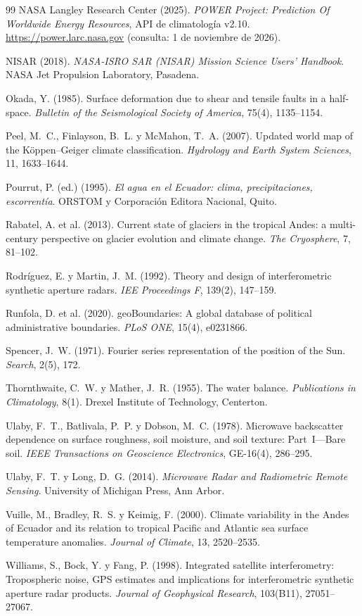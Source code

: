 \documentclass[11pt,a4paper]{article}
\begin{document}
\begin{thebibliography}{99}
 NASA Langley Research Center (2025). \emph{POWER Project: Prediction Of Worldwide
Energy Resources}, API de climatología v2.10. \url{https://power.larc.nasa.gov} (consulta: 1 de noviembre
de 2026).

 NISAR (2018). \emph{NASA-ISRO SAR (NISAR) Mission Science Users' Handbook}. NASA Jet
Propulsion Laboratory, Pasadena.

 Okada, Y. (1985). Surface deformation due to shear and tensile faults in a
half-space. \emph{Bulletin of the Seismological Society of America}, 75(4), 1135--1154.

 Peel, M.~C., Finlayson, B.~L. y McMahon, T.~A. (2007). Updated world map of the
Köppen--Geiger climate classification. \emph{Hydrology and Earth System Sciences}, 11, 1633--1644.

 Pourrut, P. (ed.) (1995). \emph{El agua en el Ecuador: clima, precipitaciones,
escorrentía}. ORSTOM y Corporación Editora Nacional, Quito.

 Rabatel, A. et al. (2013). Current state of glaciers in the tropical Andes: a
multi-century perspective on glacier evolution and climate change. \emph{The Cryosphere}, 7, 81--102.

 Rodríguez, E. y Martin, J.~M. (1992). Theory and design of interferometric
synthetic aperture radars. \emph{IEE Proceedings F}, 139(2), 147--159.

 Runfola, D. et al. (2020). geoBoundaries: A global database of political
administrative boundaries. \emph{PLoS ONE}, 15(4), e0231866.

 Spencer, J.~W. (1971). Fourier series representation of the position of the Sun.
\emph{Search}, 2(5), 172.

 Thornthwaite, C.~W. y Mather, J.~R. (1955). The water balance.
\emph{Publications in Climatology}, 8(1). Drexel Institute of Technology, Centerton.

 Ulaby, F.~T., Batlivala, P.~P. y Dobson, M.~C. (1978). Microwave backscatter
dependence on surface roughness, soil moisture, and soil texture: Part~I---Bare soil. \emph{IEEE
Transactions on Geoscience Electronics}, GE-16(4), 286--295.

 Ulaby, F.~T. y Long, D.~G. (2014). \emph{Microwave Radar and Radiometric Remote
Sensing}. University of Michigan Press, Ann Arbor.

 Vuille, M., Bradley, R.~S. y Keimig, F. (2000). Climate variability in the Andes of
Ecuador and its relation to tropical Pacific and Atlantic sea surface temperature anomalies.
\emph{Journal of Climate}, 13, 2520--2535.

 Williams, S., Bock, Y. y Fang, P. (1998). Integrated satellite interferometry:
Tropospheric noise, GPS estimates and implications for interferometric synthetic aperture radar
products. \emph{Journal of Geophysical Research}, 103(B11), 27051--27067.

\end{thebibliography}
\end{document}
